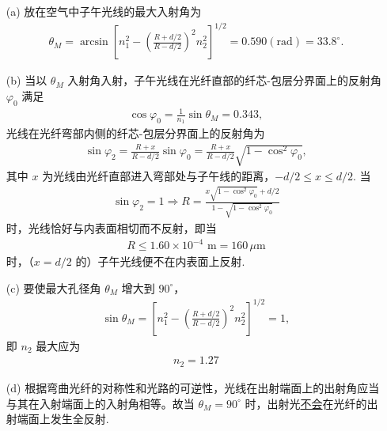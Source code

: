 \documentclass{assignment}
\begin{document}
\begin{sol}
    \begin{itemize}
        \item[(a)] 放在空气中子午光线的最大入射角为
        \begin{align}
            \theta_M=\arcsin\left[n_1^2-\left(\frac{R+d/2}{R-d/2}\right)^2n_2^2\right]^{1/2}=0.590(\text{rad})=33.8^{\circ}.
        \end{align}
        \item[(b)] 当以 $\theta_M$ 入射角入射，子午光线在光纤直部的纤芯-包层分界面上的反射角 $\varphi_0$ 满足
        \begin{align}
            \cos\varphi_0=\frac{1}{n_1}\sin\theta_M=0.343,
        \end{align}
        光线在光纤弯部内侧的纤芯-包层分界面上的反射角为
        \begin{align}
            \sin\varphi_2=\frac{R+x}{R-d/2}\sin\varphi_0=\frac{R+x}{R-d/2}\sqrt{1-\cos^2\varphi_0},
        \end{align}
        其中 $x$ 为光线由光纤直部进入弯部处与子午线的距离，$-d/2\leq x\leq d/2$. 当
        \begin{align}
            \sin\varphi_2=1\Longrightarrow R=\frac{x\sqrt{1-\cos^2\varphi_0}+d/2}{1-\sqrt{1-\cos^2\varphi_0}}
        \end{align}
        时，光线恰好与内表面相切而不反射，即当
        \begin{align}
            R\leq 1.60\times 10^{-4}\text{ m}=160\,\mu\text{m}
        \end{align}
        时，（$x=d/2$ 的）子午光线便不在内表面上反射.
        \item[(c)] 要使最大孔径角 $\theta_M$ 增大到 $90^{\circ}$，
        \begin{align}
            \sin\theta_M=\left[n_1^2-\left(\frac{R+d/2}{R-d/2}\right)^2n_2^2\right]^{1/2}=1,
        \end{align}
        即 $n_2$ 最大应为
        \begin{align}
            n_2=1.27
        \end{align}
        \item[(d)] 根据弯曲光纤的对称性和光路的可逆性，光线在出射端面上的出射角应当与其在入射端面上的入射角相等。故当 $\theta_M=90^{\circ}$ 时，出射光\uline{不会}在光纤的出射端面上发生全反射.
    \end{itemize}
\end{sol}
\end{document}
